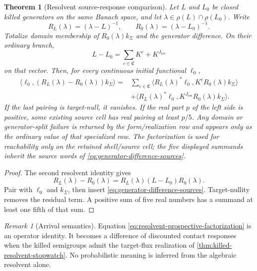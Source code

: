 \documentclass[11pt]{article}
\numberwithin{section}{part}
\theoremstyle{plain}
\newtheorem{theorem}{Theorem}[section]
\theoremstyle{definition}
\theoremstyle{remark}
\newtheorem{remark}[remark]{Remark}
\newcommand{\Res}{J_{\mathrm{res}}}
\newcommand{\Channels}{\mathfrak C}
\begin{document}
\begin{theorem}[Resolvent source-response comparison]
\label{thm:resolvent-prospective-accountability}
Let \(L\) and \(L_0\) be closed killed generators on the same Banach space,
and let \(\lambda\in\rho(L)\cap\rho(L_0)\).  Write
\[
 R_L(\lambda)=(\lambda-L)^{-1},
 \qquad R_0(\lambda)=(\lambda-L_0)^{-1}.
\]
Totalize domain membership of \(R_0(\lambda)k_\Sigma\) and the generator
difference.  On their ordinary branch,
\begin{equation}
 \label{eq:generator-difference-sources}
 L-L_0=\sum_{c\in\Channels}K^c+K^{\Res}
\end{equation}
on that vector.  Then, for every continuous initial functional \(\ell_0\),
\begin{equation}
 \label{eq:resolvent-prospective-factorization}
 \begin{aligned}
 \langle\ell_0,(R_L(\lambda)-R_0(\lambda))k_\Sigma\rangle
 ={}&\sum_{c\in\Channels}
 \langle R_L(\lambda)^*\ell_0,
 K^cR_0(\lambda)k_\Sigma\rangle\\
 &+\langle R_L(\lambda)^*\ell_0,
 K^{\Res}R_0(\lambda)k_\Sigma\rangle.
 \end{aligned}
\end{equation}
If the last pairing is target-null, it vanishes.  If the real part \(p\) of
the left side is positive, some existing source cell has real pairing at
least \(p/5\).
Any domain or generator-split failure is returned by the form/realization row
and appears only as the ordinary value of that specialized row.  The
factorization is used for reachability only on the retained shell/source cell;
the five displayed summands inherit the source words of
\eqref{eq:generator-difference-sources}.
\end{theorem}

\begin{proof}
The second resolvent identity gives
\[
 R_L(\lambda)-R_0(\lambda)
 =R_L(\lambda)(L-L_0)R_0(\lambda).
\]
Pair with \(\ell_0\) and \(k_\Sigma\), then insert
\eqref{eq:generator-difference-sources}.  Target-nullity removes the residual
term.  A positive sum of five real numbers has a summand at least one fifth
of that sum.
\end{proof}

\begin{remark}[Arrival semantics]
Equation \eqref{eq:resolvent-prospective-factorization} is an operator
identity.  It becomes a difference of discounted contact responses when the
killed semigroups admit the target-flux realization of
\cref{thm:killed-resolvent-stopwatch}.  No probabilistic meaning is inferred
from the algebraic resolvent alone.
\end{remark}
\end{document}
